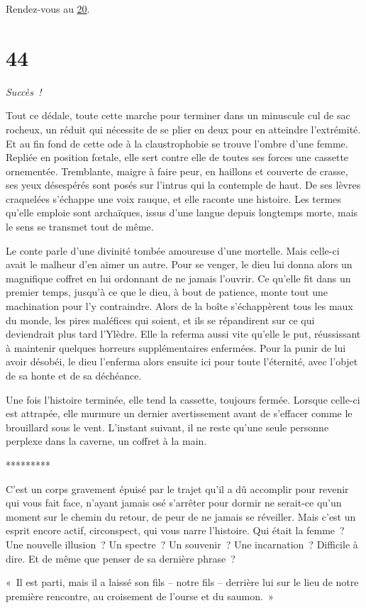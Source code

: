 \documentclass{report}
\newcommand{\gsection}[1]{
    \section{#1}
    \label{section-#1}
}
\newcommand{\glink}[1]{\hyperref[section-#1]{#1}}
\newcommand{\ellipse}{
    \begin{center}
        *********
    \end{center}
}
\newcommand{\success}{\emph{Succès !}}
\begin{document}
Rendez-vous au \glink{20}.

\gsection{44}

\success

Tout ce dédale, toute cette marche pour terminer dans un minuscule cul de sac rocheux, un réduit qui nécessite de se plier en deux pour en atteindre l'extrémité. Et au fin fond de cette ode à la claustrophobie se trouve l'ombre d'une femme. Repliée en position fœtale, elle sert contre elle de toutes ses forces une cassette ornementée. Tremblante, maigre à faire peur, en haillons et couverte de crasse, ses yeux désespérés sont posés sur l'intrus qui la contemple de haut. De ses lèvres craquelées s'échappe une voix rauque, et elle raconte une histoire. Les termes qu'elle emploie sont archaïques, issus d'une langue depuis longtemps morte, mais le sens se transmet tout de même.

Le conte parle d'une divinité tombée amoureuse d'une mortelle. Mais celle-ci avait le malheur d'en aimer un autre. Pour se venger, le dieu lui donna alors un magnifique coffret en lui ordonnant de ne jamais l'ouvrir. Ce qu'elle fit dans un premier temps, jusqu'à ce que le dieu, à bout de patience, monte tout une machination pour l'y contraindre. Alors de la boîte s'échappèrent tous les maux du monde, les pires maléfices qui soient, et ils se répandirent sur ce qui deviendrait plus tard l'Ylèdre. Elle la referma aussi vite qu'elle le put, réussissant à maintenir quelques horreurs supplémentaires enfermées. Pour la punir de lui avoir désobéi, le dieu l'enferma alors ensuite ici pour toute l'éternité, avec l'objet de sa honte et de sa déchéance.

Une fois l'histoire terminée, elle tend la cassette, toujours fermée. Lorsque celle-ci est attrapée, elle murmure un dernier avertissement avant de s'effacer comme le brouillard sous le vent. L'instant suivant, il ne reste qu'une seule personne perplexe dans la caverne, un coffret à la main.

\ellipse

C'est un corps gravement épuisé par le trajet qu'il a dû accomplir pour revenir qui vous fait face, n'ayant jamais osé s'arrêter pour dormir ne serait-ce qu'un moment sur le chemin du retour, de peur de ne jamais se réveiller. Mais c'est un esprit encore actif, circonspect, qui vous narre l'histoire. Qui était la femme ? Une nouvelle illusion ? Un spectre ? Un souvenir ? Une incarnation ? Difficile à dire. Et de même que penser de sa dernière phrase ?

« Il est parti, mais il a laissé son fils – notre fils – derrière lui sur le lieu de notre première rencontre, au croisement de l'ourse et du saumon. »
\end{document}
